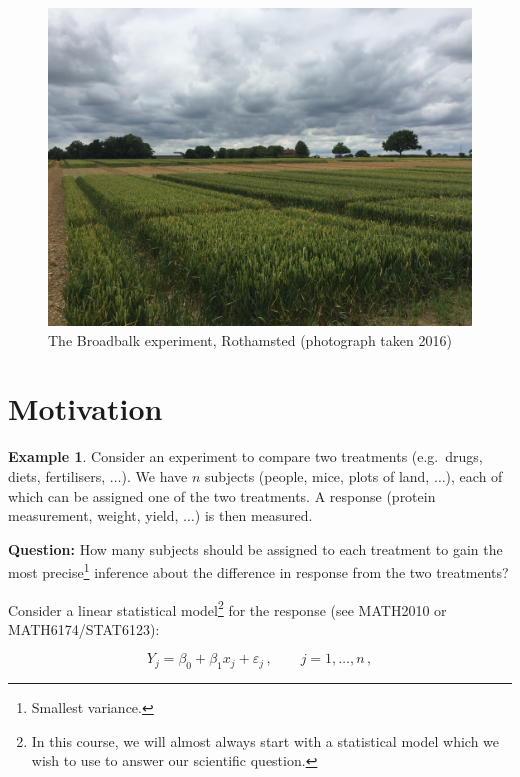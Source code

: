 \documentclass[
]{book}
\theoremstyle{definition}
\theoremstyle{definition}
\newtheorem{example}{Example}[chapter]
\theoremstyle{definition}
\theoremstyle{definition}
\theoremstyle{remark}
\begin{document}
\begin{figure}

{\centering \includegraphics[width=0.75\linewidth]{figures/broadbalk} 

}

\caption{The Broadbalk experiment, Rothamsted (photograph taken 2016)}\label{fig:broadbalk}
\end{figure}

\hypertarget{motivation}{%
\section{Motivation}\label{motivation}}

\begin{example}
\protect\hypertarget{exm:motivation}{}\label{exm:motivation}Consider an experiment to compare two treatments (e.g.~drugs, diets, fertilisers, \(\dots\)). We have \(n\) subjects (people, mice, plots of land, \(\dots\)), each of which can be assigned one of the two treatments. A response (protein measurement, weight, yield, \(\dots\)) is then measured.
\end{example}

\textbf{Question:} How many subjects should be assigned to each treatment to gain the most precise\footnote{Smallest variance.} inference about the difference in response from the two treatments?

Consider a linear statistical model\footnote{In this course, we will almost always start with a statistical model which we wish to use to answer our scientific question.} for the response (see MATH2010 or MATH6174/STAT6123):

\begin{equation}
Y_j=\beta_{0}+\beta_{1}x_j+\varepsilon_j\,,\qquad j=1, \ldots, n\,,
\label{eq:slr}
\end{equation}
\end{document}
